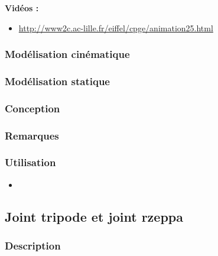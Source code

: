\documentclass[11pt,oneside]{article}
\begin{document}
\textbf{Vidéos :}
\begin{itemize}
\item \url{http://www2c.ac-lille.fr/eiffel/cpge/animation25.html}
\end{itemize}

\subsubsection{Modélisation cinématique}
\subsubsection{Modélisation statique}
\subsubsection{Conception}
\subsubsection{Remarques}
\subsubsection{Utilisation}
\begin{itemize}
\item
\end{itemize}

\newpage

\subsection{Joint tripode et joint rzeppa}
\subsubsection{Description}
\end{document}
